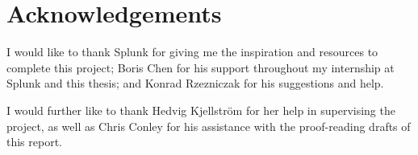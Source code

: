 \chapter*{Acknowledgements}

I would like to thank Splunk for giving me the inspiration and resources to complete this project; Boris Chen for his support throughout my internship at Splunk and this thesis; and Konrad Rzezniczak for his suggestions and help.

I would further like to thank Hedvig Kjellström for her help in supervising the project, as well as Chris Conley for his assistance with the proof-reading drafts of this report.
